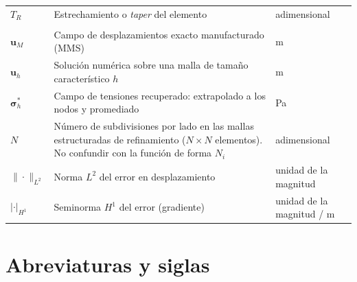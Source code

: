 \begin{longtable}{@{}>{\raggedright\arraybackslash}p{3.0cm}p{7.8cm}p{3.0cm}@{}}
$T_R$ & Estrechamiento o \emph{taper} del elemento & adimensional \\
\addlinespace
\multicolumn{3}{@{}l}{\textit{Verificación y validación}} \\
\addlinespace
$\bm{u}_M$ & Campo de desplazamientos exacto manufacturado (MMS) & m \\
$\bm{u}_h$ & Solución numérica sobre una malla de tamaño característico $h$ & m \\
$\bm{\sigma}^*_h$ & Campo de tensiones recuperado: extrapolado a los nodos y promediado & Pa \\
$N$ & Número de subdivisiones por lado en las mallas estructuradas de refinamiento ($N\times N$ elementos). No confundir con la función de forma $N_i$ & adimensional \\
$\|\cdot\|_{L^2}$ & Norma $L^2$ del error en desplazamiento & unidad de la magnitud \\
$|\cdot|_{H^1}$ & Seminorma $H^1$ del error (gradiente) & unidad de la magnitud / m \\
\end{longtable}

\section*{Abreviaturas y siglas}

